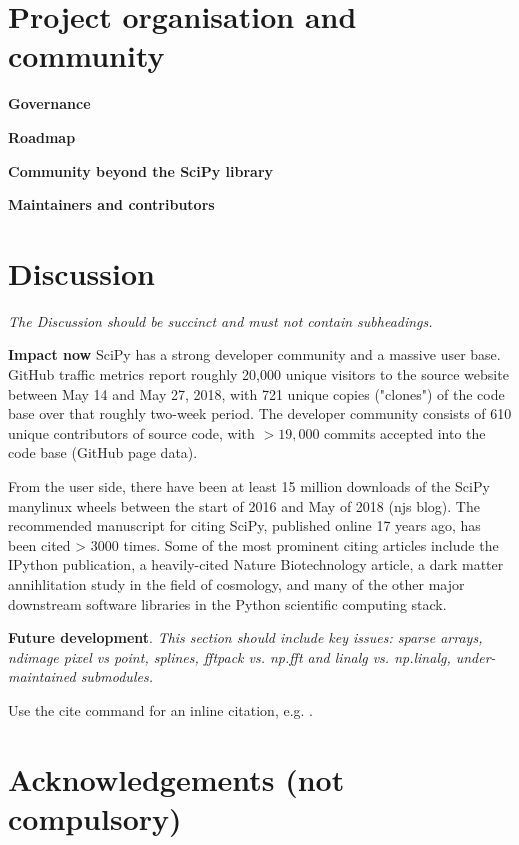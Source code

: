 \documentclass[fleqn,10pt]{wlscirep}
\begin{document}
\section*{Project organisation and community}

\textbf{Governance}

\textbf{Roadmap}

\textbf{Community beyond the SciPy library}

\textbf{Maintainers and contributors}


\section*{Discussion}

\textit{The Discussion should be succinct and must not contain subheadings.}

\textbf{Impact now}
SciPy has a strong developer community and a massive user base. GitHub
traffic metrics report roughly 20,000 unique visitors to the source
website between May 14 and May 27, 2018, with 721 unique copies ("clones")
of the code base over that roughly two-week period. The developer community
consists of 610 unique contributors of source code, with $>19,000$ commits
accepted into the code base (GitHub page data).

From the user side, there have been at least 15 million downloads
of the SciPy manylinux wheels between the start of 2016 and May of 2018
(njs blog). The recommended manuscript for citing SciPy,
published online 17 years ago, has been cited > 3000
times. Some of the most prominent citing articles include the IPython
publication, a heavily-cited Nature Biotechnology article, a dark
matter annihlitation study in the field of cosmology, and many of the
other major downstream software libraries in the Python scientific
computing stack.

\textbf{Future development}.
\textit{This section should include key issues: sparse arrays, ndimage pixel vs point, splines, fftpack vs. np.fft and linalg vs. np.linalg, under-maintained submodules.}




\noindent Use the cite command for an inline citation, e.g. \cite{behnel2011cython}.

\section*{Acknowledgements (not compulsory)}
\end{document}
